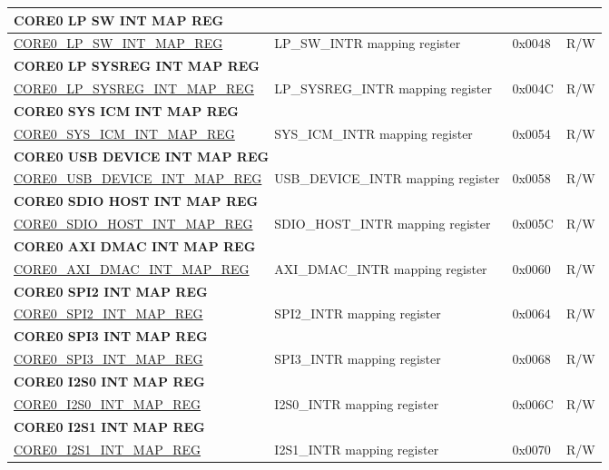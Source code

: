 \begin{longtable}{ | p{7.5cm} | p{7.2cm} | p{1.3cm} | p{1cm} | }
\multicolumn{4}{|l|}{\textbf{CORE0 LP SW INT MAP REG}} \\ \hline
\hyperref[regdesc:CORE0LPSWINTMAPREG]{CORE0\_LP\_SW\_INT\_MAP\_REG} & LP\_SW\_INTR mapping register & 0x0048 & R/W \\ \hline
\multicolumn{4}{|l|}{\textbf{CORE0 LP SYSREG INT MAP REG}} \\ \hline
\hyperref[regdesc:CORE0LPSYSREGINTMAPREG]{CORE0\_LP\_SYSREG\_INT\_MAP\_REG} & LP\_SYSREG\_INTR mapping register & 0x004C & R/W \\ \hline
\multicolumn{4}{|l|}{\textbf{CORE0 SYS ICM INT MAP REG}} \\ \hline
\hyperref[regdesc:CORE0SYSICMINTMAPREG]{CORE0\_SYS\_ICM\_INT\_MAP\_REG} & SYS\_ICM\_INTR mapping register & 0x0054 & R/W \\ \hline
\multicolumn{4}{|l|}{\textbf{CORE0 USB DEVICE INT MAP REG}} \\ \hline
\hyperref[regdesc:CORE0USBDEVICEINTMAPREG]{CORE0\_USB\_DEVICE\_INT\_MAP\_REG} & USB\_DEVICE\_INTR mapping register & 0x0058 & R/W \\ \hline
\multicolumn{4}{|l|}{\textbf{CORE0 SDIO HOST INT MAP REG}} \\ \hline
\hyperref[regdesc:CORE0SDIOHOSTINTMAPREG]{CORE0\_SDIO\_HOST\_INT\_MAP\_REG} & SDIO\_HOST\_INTR mapping register & 0x005C & R/W \\ \hline
\multicolumn{4}{|l|}{\textbf{CORE0 AXI DMAC INT MAP REG}} \\ \hline
\hyperref[regdesc:CORE0AXIDMACINTMAPREG]{CORE0\_AXI\_DMAC\_INT\_MAP\_REG} & AXI\_DMAC\_INTR mapping register & 0x0060 & R/W \\ \hline
\multicolumn{4}{|l|}{\textbf{CORE0 SPI2 INT MAP REG}} \\ \hline
\hyperref[regdesc:CORE0SPI2INTMAPREG]{CORE0\_SPI2\_INT\_MAP\_REG} & SPI2\_INTR mapping register & 0x0064 & R/W \\ \hline
\multicolumn{4}{|l|}{\textbf{CORE0 SPI3 INT MAP REG}} \\ \hline
\hyperref[regdesc:CORE0SPI3INTMAPREG]{CORE0\_SPI3\_INT\_MAP\_REG} & SPI3\_INTR mapping register & 0x0068 & R/W \\ \hline
\multicolumn{4}{|l|}{\textbf{CORE0 I2S0 INT MAP REG}} \\ \hline
\hyperref[regdesc:CORE0I2S0INTMAPREG]{CORE0\_I2S0\_INT\_MAP\_REG} & I2S0\_INTR mapping register & 0x006C & R/W \\ \hline
\multicolumn{4}{|l|}{\textbf{CORE0 I2S1 INT MAP REG}} \\ \hline
\hyperref[regdesc:CORE0I2S1INTMAPREG]{CORE0\_I2S1\_INT\_MAP\_REG} & I2S1\_INTR mapping register & 0x0070 & R/W \\ \hline

\end{longtable}
